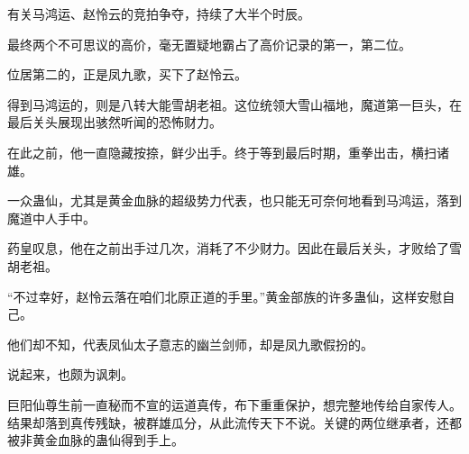 \begin{this_body}
有关马鸿运、赵怜云的竞拍争夺，持续了大半个时辰。

最终两个不可思议的高价，毫无置疑地霸占了高价记录的第一，第二位。

位居第二的，正是凤九歌，买下了赵怜云。

得到马鸿运的，则是八转大能雪胡老祖。这位统领大雪山福地，魔道第一巨头，在最后关头展现出骇然听闻的恐怖财力。

在此之前，他一直隐藏按捺，鲜少出手。终于等到最后时期，重拳出击，横扫诸雄。

一众蛊仙，尤其是黄金血脉的超级势力代表，也只能无可奈何地看到马鸿运，落到魔道中人手中。

药皇叹息，他在之前出手过几次，消耗了不少财力。因此在最后关头，才败给了雪胡老祖。

“不过幸好，赵怜云落在咱们北原正道的手里。”黄金部族的许多蛊仙，这样安慰自己。

他们却不知，代表凤仙太子意志的幽兰剑师，却是凤九歌假扮的。

说起来，也颇为讽刺。

巨阳仙尊生前一直秘而不宣的运道真传，布下重重保护，想完整地传给自家传人。结果却落到真传残缺，被群雄瓜分，从此流传天下不说。关键的两位继承者，还都被非黄金血脉的蛊仙得到手上。

\end{this_body}

